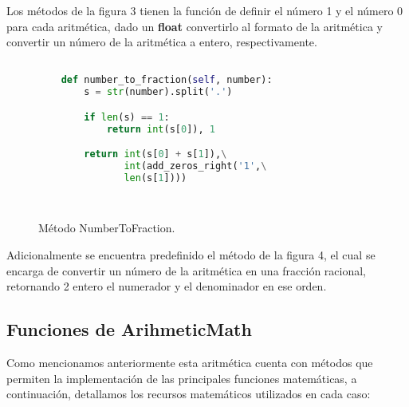 \documentclass[a4paper,10pt,twocolumn]{article}
\begin{document}
	Los métodos de la figura 3 tienen la función de definir el número 1 y el número 0 para cada aritmética, dado un \textbf{float} convertirlo al formato de la aritmética y  convertir un número de la aritmética a entero, respectivamente.
	
	\begin{figure}[htb]%
			\begin{lstlisting}[language=python]%

    def number_to_fraction(self, number):
        s = str(number).split('.')

        if len(s) == 1:
            return int(s[0]), 1

        return int(s[0] + s[1]),\
               int(add_zeros_right('1',\
               len(s[1])))

		
		\end{lstlisting}
		\caption{Método NumberToFraction.\label{fig:code}}
		\end{figure}
		
	Adicionalmente se encuentra predefinido el método de la figura 4, el cual se encarga de convertir un número de la aritmética en una fracción racional, retornando 2 entero el numerador y el denominador en ese orden.
	
\subsection{Funciones de ArihmeticMath}\label{sub:result}

	
	Como mencionamos anteriormente esta aritmética cuenta con métodos que permiten la implementación de las principales funciones matemáticas, a continuación, detallamos los recursos matemáticos utilizados en cada caso:
	
\end{document}
